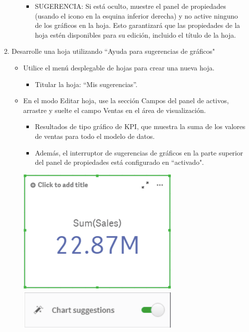 \documentclass[12pt,letterpaper]{article}
\begin{document}
\begin{enumerate}
\begin{itemize}
        \begin{itemize}
            \item SUGERENCIA: Si está oculto, muestre el panel de propiedades (usando el icono en la esquina inferior derecha) y no active ninguno de los gráficos en la hoja. Esto garantizará que las propiedades de la hoja estén disponibles para su edición, incluido el título de la hoja.
        \end{itemize}
    \end{itemize}
    \item Desarrolle una hoja utilizando ``Ayuda para sugerencias de gráficos"\\
    \begin{itemize}
        \item Utilice el menú desplegable de hojas para crear una nueva hoja.
        \begin{itemize}
            \item Titular la hoja: “Mis sugerencias”.
        \end{itemize}
        \item En el modo Editar hoja, use la sección Campos del panel de activos, arrastre y suelte el campo Ventas en el área de visualización.
        \begin{itemize}
            \item Resultados de tipo gráfico de KPI, que muestra la suma de los valores de ventas para todo el modelo de datos.
            \item Además, el interruptor de sugerencias de gráficos en la parte superior del panel de propiedades está configurado en ``activado".\\
        \end{itemize}
        \begin{center}
            \includegraphics[width=8cm]{./img/image3.png} 
            \includegraphics[width=8cm]{./img/image4.png}

\end{center}
\end{itemize}
\end{enumerate}
\end{document}
